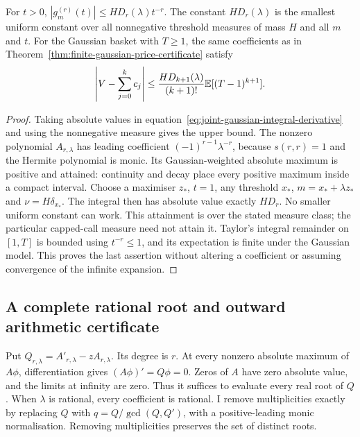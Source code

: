 \begin{theorem}
\label{thm:joint-threshold-norm}
For $t>0$, $|g_m^{(r)}(t)|\leq H D_r(\lambda)t^{-r}$.
The constant $H D_r(\lambda)$ is the smallest uniform constant over all
nonnegative threshold measures of mass $H$ and all $m$ and $t$.
For the Gaussian basket with $T\geq1$, the same coefficients as in
Theorem~\ref{thm:finite-gaussian-price-certificate} satisfy
\begin{equation}
 \left|V-\sum_{j=0}^k c_j\right|
 \leq {H D_{k+1}(\lambda)\over(k+1)!}
                      \mathbb E[(T-1)^{k+1}].
 \label{eq:joint-norm-price-remainder}
\end{equation}
\end{theorem}
\begin{proof}
Taking absolute values in
equation~\eqref{eq:joint-gaussian-integral-derivative} and using the
nonnegative measure gives the upper bound. The nonzero polynomial
$A_{r,\lambda}$ has leading coefficient
$(-1)^{r-1}\lambda^{-r}$, because $s(r,r)=1$ and the Hermite polynomial
is monic. Its Gaussian-weighted absolute maximum is positive and attained:
continuity and decay place every positive maximum inside a compact interval.
Choose a maximiser $z_*$, $t=1$, any threshold $x_*$, $m=x_*+\lambda z_*$
and $\nu=H\delta_{x_*}$. The integral then has absolute value exactly
$H D_r$. No smaller uniform constant can work. This attainment is over
the stated measure class; the particular capped-call measure need not
attain it. Taylor's integral remainder on $[1,T]$ is bounded using
$t^{-r}\leq1$, and its expectation is finite under the Gaussian model.
This proves the last assertion without altering a coefficient or assuming
convergence of the infinite expansion.
\end{proof}

\subsection{A complete rational root and outward arithmetic certificate}

Put $Q_{r,\lambda}=A'_{r,\lambda}-zA_{r,\lambda}$. Its degree is $r$.
At every nonzero absolute maximum of $A\phi$, differentiation gives
$(A\phi)'=Q\phi=0$. Zeros of $A$ have zero absolute value, and the
limits at infinity are zero. Thus it suffices to evaluate every real
root of $Q$. When $\lambda$ is rational, every coefficient is rational.
I remove multiplicities exactly by replacing $Q$ with
$q=Q/\gcd(Q,Q')$, with a positive-leading monic normalisation.
Removing multiplicities preserves the set of distinct roots.

